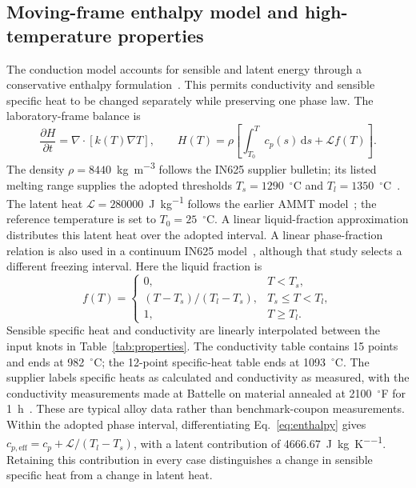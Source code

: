 \subsection{Moving-frame enthalpy model and high-temperature properties}
The conduction model accounts for sensible and latent energy through a conservative enthalpy formulation~\cite{vanelsen2007}. This permits conductivity and sensible specific heat to be changed separately while preserving one phase law. The laboratory-frame balance is
\begin{equation}
 \frac{\partial H}{\partial t}=\nabla\cdot[k(T)\nabla T],\qquad
 H(T)=\rho\left[\int_{T_0}^{T}c_p(s)\,\mathrm ds+\mathcal L f(T)\right].
 \label{eq:enthalpy}
\end{equation}
The density $\rho=8440$~\si{\kilogram\per\cubic\metre} follows the IN625 supplier bulletin; its listed melting range supplies the adopted thresholds $T_s=1290$~$^\circ$C and $T_l=1350$~$^\circ$C~\cite{specialmetals625}. The latent heat $\mathcal L=280000$~\si{\joule\per\kilogram} follows the earlier AMMT model~\cite{kollmannsberger2019}; the reference temperature is set to $T_0=25$~$^\circ$C. A linear liquid-fraction approximation distributes this latent heat over the adopted interval. A linear phase-fraction relation is also used in a continuum IN625 model~\cite{dynamic2024}, although that study selects a different freezing interval. Here the liquid fraction is
\begin{equation}
 f(T)=\begin{cases}
 0,&T<T_s,\\
 (T-T_s)/(T_l-T_s),&T_s\leq T<T_l,\\
 1,&T\geq T_l.
 \end{cases}
\end{equation}
Sensible specific heat and conductivity are linearly interpolated between the input knots in Table~\ref{tab:properties}. The conductivity table contains 15 points and ends at 982~$^\circ$C; the 12-point specific-heat table ends at 1093~$^\circ$C. The supplier labels specific heats as calculated and conductivity as measured, with the conductivity measurements made at Battelle on material annealed at 2100~$^\circ$F for 1~h~\cite{specialmetals625}. These are typical alloy data rather than benchmark-coupon measurements. Within the adopted phase interval, differentiating Eq.~\eqref{eq:enthalpy} gives $c_{p,\mathrm{eff}}=c_p+\mathcal L/(T_l-T_s)$, with a latent contribution of 4666.67~\si{\joule\per\kilogram\per\kelvin}. Retaining this contribution in every case distinguishes a change in sensible specific heat from a change in latent heat.

